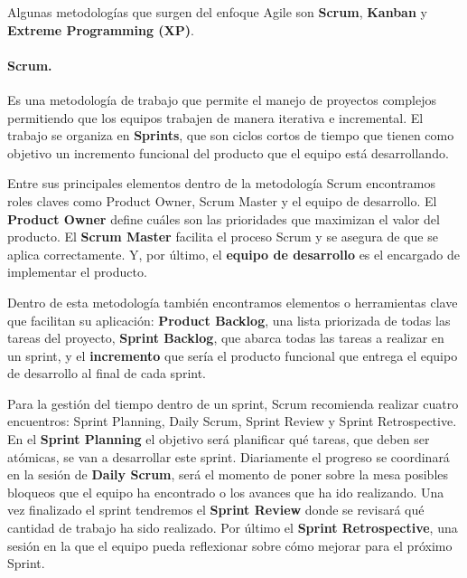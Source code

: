 Algunas metodologías que surgen del enfoque Agile son \textbf{Scrum}, \textbf{Kanban} y \textbf{Extreme Programming (XP)}.

\paragraph{Scrum.} Es una metodología de trabajo que permite el manejo de proyectos complejos permitiendo que los equipos trabajen de manera iterativa e incremental. El trabajo se organiza en \textbf{Sprints}, que son ciclos cortos de tiempo que tienen como objetivo un incremento funcional del producto que el equipo está desarrollando.\cite{scrum}

Entre sus principales elementos dentro de la metodología Scrum encontramos roles claves como Product Owner, Scrum Master y el equipo de desarrollo. El \textbf{Product Owner} define cuáles son las prioridades que maximizan el valor del producto. El \textbf{Scrum Master} facilita el proceso Scrum y se asegura de que se aplica correctamente. Y, por último, el \textbf{equipo de desarrollo} es el encargado de implementar el producto.

Dentro de esta metodología también encontramos elementos o herramientas clave que facilitan su aplicación: \textbf{Product Backlog}, una lista priorizada de todas las tareas del proyecto, \textbf{Sprint Backlog}, que abarca todas las tareas a realizar en un sprint, y el \textbf{incremento} que sería el producto funcional que entrega el equipo de desarrollo al final de cada sprint.

Para la gestión del tiempo dentro de un sprint, Scrum recomienda realizar cuatro encuentros: Sprint Planning, Daily Scrum, Sprint Review y Sprint Retrospective. En el \textbf{Sprint Planning} el objetivo será planificar qué tareas, que deben ser atómicas, se van a desarrollar este sprint. Diariamente el progreso se coordinará en la sesión de \textbf{Daily Scrum}, será el momento de poner sobre la mesa posibles bloqueos que el equipo ha encontrado o los avances que ha ido realizando. Una vez finalizado el sprint tendremos el \textbf{Sprint Review} donde se revisará qué cantidad de trabajo ha sido realizado. Por último el \textbf{Sprint Retrospective}, una sesión en la que el equipo pueda reflexionar sobre cómo mejorar para el próximo Sprint.

